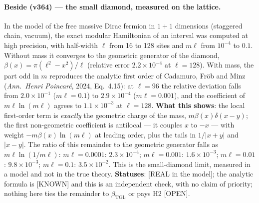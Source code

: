 \documentclass[11pt]{article}
\newcommand{\bTGL}{\beta_{\mathrm{TGL}}}\newcommand{\Msun}{M_{\odot}}\newcommand{\TGL}{\mathrm{TGL}}
\theoremstyle{definition}\newtheorem{deriv}{Derivation}
\begin{document}
\paragraph*{Beside (v364) --- the small diamond, measured on the lattice.} In the model of the free massive Dirac fermion in $1+1$ dimensions (staggered chain, vacuum), the exact modular Hamiltonian of an interval was computed at high precision, with half-width $\ell$ from 16 to 128 sites and $m\ell$ from $10^{-4}$ to $0.1$. Without mass it converges to the geometric generator of the diamond, $\beta(x)=\pi(\ell^2-x^2)/\ell$ (relative error $2.2\times10^{-4}$ at $\ell=128$). With mass, the part odd in $m$ reproduces the analytic first order of Cadamuro, Fröb and Minz (\emph{Ann.\ Henri Poincaré}, 2024, Eq.~4.15): at $\ell=96$ the relative deviation falls from $2.0\times10^{-1}$ ($m\ell=0.1$) to $2.9\times10^{-4}$ ($m\ell=0.001$), and the coefficient of $m\ell\ln(m\ell)$ agrees to $1.1\times10^{-3}$ at $\ell=128$. \textbf{What this shows}: the local first-order term is \emph{exactly} the geometric charge of the mass, $m\beta(x)\delta(x-y)$; the first non-geometric coefficient is antilocal --- it couples $x$ to $-x$ --- with weight $-m\beta(x)\ln(m\ell)$ at leading order, plus the tails in $1/|x+y|$ and $|x-y|$. The ratio of this remainder to the geometric generator falls as $m\ell\ln(1/m\ell)$: $m\ell=0.0001$: $2.3\times10^{-4}$; $m\ell=0.001$: $1.6\times10^{-3}$; $m\ell=0.01$: $9.8\times10^{-3}$; $m\ell=0.1$: $3.5\times10^{-2}$. This is the small-diamond limit, measured in a model and not in the true theory. \textbf{Statuses}: [REAL in the model]; the analytic formula is [KNOWN] and this is an independent check, with no claim of priority; nothing here ties the remainder to $\bTGL$ or pays H2 [OPEN].
\end{document}
